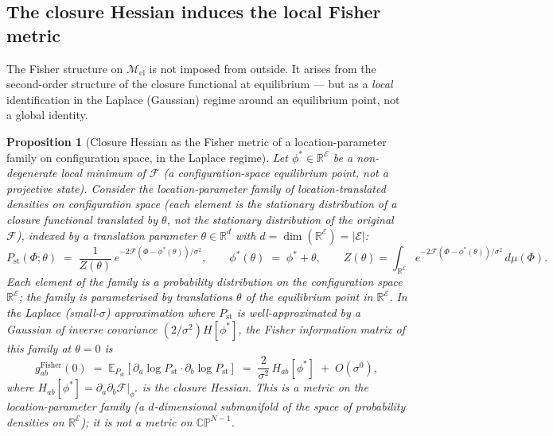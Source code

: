 \documentclass[12pt]{article}
\newtheorem{proposition}[theorem]{Proposition}
\newcommand{\Ecal}{\mathcal{E}}
\newcommand{\Fcal}{\mathcal{F}}
\newcommand{\Mcl}{\mathcal{M}_{\mathrm{cl}}}
\newcommand{\Pst}{P_{\mathrm{st}}}
\begin{document}
\subsection{The closure Hessian induces the local Fisher metric}\label{subsec:hessian_fisher}

The Fisher structure on $\Mcl$ is not imposed from outside. It arises from the second-order structure of the closure functional at equilibrium --- but as a \emph{local} identification in the Laplace (Gaussian) regime around an equilibrium point, not a global identity.

\begin{proposition}[Closure Hessian as the Fisher metric of a location-parameter family on configuration space, in the Laplace regime]\label{prop:hessian_fisher}
Let $\phi^* \in \mathbb{R}^\Ecal$ be a non-degenerate local minimum of $\Fcal$ (a configuration-space equilibrium point, \emph{not} a projective state). Consider the \emph{location-parameter family} of location-translated densities on configuration space (each element is the stationary distribution of a closure functional translated by $\theta$, not the stationary distribution of the original $\Fcal$), indexed by a translation parameter $\theta \in \mathbb{R}^d$ with $d = \dim(\mathbb{R}^\Ecal) = |\Ecal|$:
\begin{equation}
    \Pst(\Phi;\theta) \;=\; \frac{1}{Z(\theta)}\, e^{-2\Fcal(\Phi - \phi^*(\theta))/\sigma^2},
    \qquad \phi^*(\theta) \;=\; \phi^* + \theta,
    \qquad Z(\theta) = \int_{\mathbb{R}^\Ecal} e^{-2\Fcal(\Phi - \phi^*(\theta))/\sigma^2}\,d\mu(\Phi).
\end{equation}
Each element of the family is a probability distribution on the configuration space $\mathbb{R}^\Ecal$; the family is parameterised by translations $\theta$ of the equilibrium point in $\mathbb{R}^\Ecal$. In the Laplace (small-$\sigma$) approximation where $\Pst$ is well-approximated by a Gaussian of inverse covariance $(2/\sigma^2) H[\phi^*]$, the Fisher information matrix of this family at $\theta = 0$ is
\begin{equation}\label{eq:hessian_fisher}
    g^{\mathrm{Fisher}}_{ab}(0)
    \;=\; \mathbb{E}_{\Pst}\!\left[\partial_a \log\Pst \cdot \partial_b \log\Pst\right]
    \;=\; \frac{2}{\sigma^2}\, H_{ab}[\phi^*] \;+\; O(\sigma^0),
\end{equation}
where $H_{ab}[\phi^*] = \partial_a\partial_b \Fcal|_{\phi^*}$ is the closure Hessian. This is a metric on the location-parameter family (a $d$-dimensional submanifold of the space of probability densities on $\mathbb{R}^\Ecal$); it is \emph{not} a metric on $\mathbb{CP}^{N-1}$.
\end{proposition}
\end{document}
